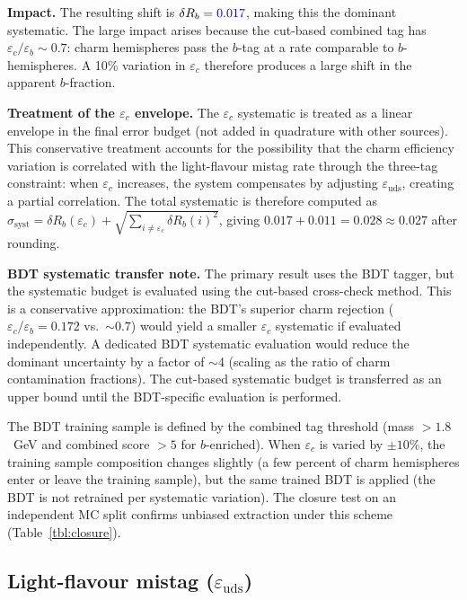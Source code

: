 \documentclass[11pt,a4paper]{article}
\newcommand{\measured}[1]{\textcolor{blue}{#1}}
\begin{document}
\textbf{Impact.}
The resulting shift is $\delta R_b = \measured{0.017}$, making this the
dominant systematic.  The large impact arises because the cut-based
combined tag has $\varepsilon_c / \varepsilon_b \sim 0.7$: charm
hemispheres pass the $b$-tag at a rate comparable to $b$-hemispheres.
A 10\% variation in $\varepsilon_c$ therefore produces a large shift
in the apparent $b$-fraction.

\textbf{Treatment of the $\varepsilon_c$ envelope.}
The $\varepsilon_c$ systematic is treated as a linear envelope in the
final error budget (not added in quadrature with other sources).  This
conservative treatment accounts for the possibility that the charm
efficiency variation is correlated with the light-flavour mistag rate
through the three-tag constraint: when $\varepsilon_c$ increases, the
system compensates by adjusting $\varepsilon_\mathrm{uds}$, creating a
partial correlation.  The total systematic is therefore computed as
$\sigma_\mathrm{syst} = \delta R_b(\varepsilon_c) + \sqrt{\sum_{i \neq
\varepsilon_c} \delta R_b(i)^2}$, giving
$0.017 + 0.011 = 0.028 \approx 0.027$ after rounding.

\textbf{BDT systematic transfer note.}
The primary result uses the BDT tagger, but the systematic budget is
evaluated using the cut-based cross-check method.  This is a conservative
approximation: the BDT's superior charm rejection
($\varepsilon_c/\varepsilon_b = 0.172$ vs.\ $\sim 0.7$) would yield a
smaller $\varepsilon_c$ systematic if evaluated independently.  A
dedicated BDT systematic evaluation would reduce the dominant uncertainty
by a factor of $\sim$4 (scaling as the ratio of charm contamination
fractions).  The cut-based systematic budget is transferred as an upper
bound until the BDT-specific evaluation is performed.

The BDT training sample is defined by the combined tag threshold
(mass $> 1.8$~GeV and combined score $> 5$ for $b$-enriched).  When
$\varepsilon_c$ is varied by $\pm 10\%$, the training sample composition
changes slightly (a few percent of charm hemispheres enter or leave the
training sample), but the same trained BDT is applied (the BDT is not
retrained per systematic variation).  The closure test on an independent
MC split confirms unbiased extraction under this scheme
(Table~\ref{tbl:closure}).

\subsection{Light-flavour mistag ($\varepsilon_\mathrm{uds}$)}
\label{sec:syst-epsuds}
\end{document}
